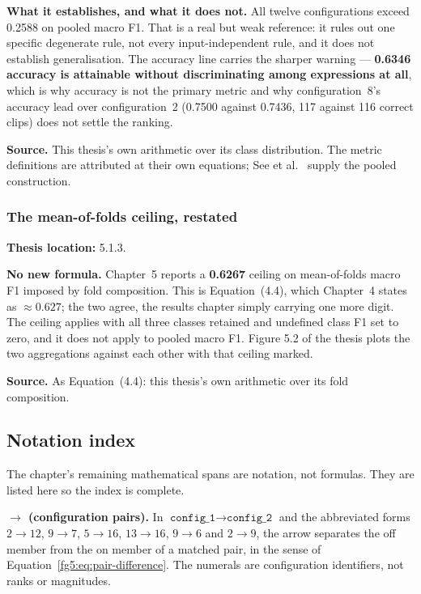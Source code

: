 \documentclass[11pt,a4paper]{article}
\numberwithin{equation}{section}
\begin{document}
\textbf{What it establishes, and what it does not.} All twelve configurations
exceed 0.2588 on pooled macro F1. That is a real but weak reference: it
rules out one specific degenerate rule, not every input-independent rule, and
it does not establish generalisation. The accuracy line carries the sharper
warning --- \textbf{0.6346 accuracy is attainable without discriminating among
expressions at all}, which is why accuracy is not the primary metric and why
configuration~8's accuracy lead over configuration~2 (0.7500 against 0.7436,
117 against 116 correct clips) does not settle the ranking.

\textbf{Source.} This thesis's own arithmetic over its class distribution. The
metric definitions are attributed at their own equations; See et
al.~\cite{see2019} supply the pooled construction.

\subsubsection{The mean-of-folds ceiling, restated}
\label{fg5:ceiling-ch5}
\textbf{Thesis location:} 5.1.3.

\textbf{No new formula.} Chapter~5 reports a \textbf{0.6267} ceiling on
mean-of-folds macro F1 imposed by fold composition. This is
Equation~(4.4), which Chapter~4 states as $\approx 0.627$; the two agree, the
results chapter simply carrying one more digit. The ceiling applies with all
three classes retained and undefined class F1 set to zero, and it does not
apply to pooled macro F1. Figure 5.2 of the thesis plots the two aggregations
against each other with that ceiling marked.

\textbf{Source.} As Equation~(4.4): this thesis's own arithmetic over its fold
composition.

\subsection{Notation index}
\label{fg5:notation}

The chapter's remaining mathematical spans are notation, not formulas. They
are listed here so the index is complete.

\textbf{$\rightarrow$ (configuration pairs).} In
$\texttt{config\_1} \rightarrow \texttt{config\_2}$ and the abbreviated forms
$2\rightarrow12$, $9\rightarrow7$, $5\rightarrow16$, $13\rightarrow16$,
$9\rightarrow6$ and $2\rightarrow9$, the arrow separates the off member from
the on member of a matched pair, in the sense of
Equation~\eqref{fg5:eq:pair-difference}. The numerals are configuration
identifiers, not ranks or magnitudes.
\end{document}
